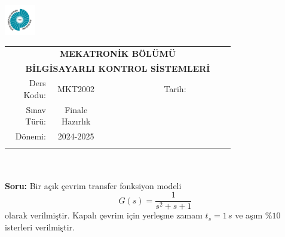 \newcommand\UniversiteAdi{Niğde Ömer Halisdemir Üniversitesi}
\newcommand\BolumAdi{MEKATRONİK BÖLÜMÜ}
\newcommand\DersKodu{MKT2002}
\newcommand\DersAdi{BİLGİSAYARLI KONTROL SİSTEMLERİ}
\newcommand\SinavAdi{Finale Hazırlık}
\newcommand\SinavTarihi{}
\newcommand\SinavSaati{}
\newcommand\SinavSuresi{}

\pagestyle{fancy}
\fancyhf{} %
\noindent \includegraphics[width=0.1\textwidth]{logo}
\begin{tabular}{
    p{0.15\linewidth}
    p{0.15\linewidth}
    p{0.2\linewidth}
    p{0.1\linewidth}
    p{0.15\linewidth}}
    \multicolumn{5}{c}{\textbf{\BolumAdi}}\\
    \multicolumn{5}{c}{\textbf{\DersAdi}}\\\hline
    \multicolumn{1}{|r|}{Ders Kodu:}&
    \multicolumn{1}{|c|}{\DersKodu}&
    \multicolumn{1}{|c|}{}& 
    \multicolumn{1}{|r|}{Tarih:}&
    \multicolumn{1}{|c|}{\SinavTarihi} \\\hline
    \multicolumn{1}{|r|}{Sınav Türü:}&
    \multicolumn{1}{|c|}{\SinavAdi}&  
    \multicolumn{1}{|c|}{}&
    \multicolumn{1}{|r|}{}&
    \multicolumn{1}{|c|}{\SinavSaati}\\\hline
    \multicolumn{1}{|r|}{Dönemi:}&
    \multicolumn{1}{|c|}{2024-2025}&
    \multicolumn{1}{|c|}{}&
    \multicolumn{1}{|r|}{}&
    \multicolumn{1}{|c|}{\SinavSuresi} \\\hline
    &&&&\\
\end{tabular}\\\\
\noindent\textbf{Soru:} Bir açık çevrim transfer fonksiyon modeli
\begin{equation*}
    G(s)=\frac{1}{s^2+s+1}
\end{equation*}
olarak verilmiştir. Kapalı çevrim için yerleşme zamanı $t_s=1\,s$ ve aşım $\%10$ isterleri verilmiştir.

